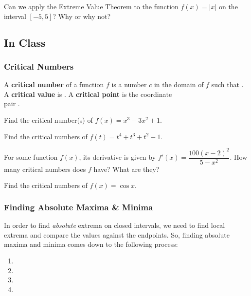 \documentclass[notes]{subfiles}
\begin{document}
		\begin{ex}
			Can we apply the Extreme Value Theorem to the function $f(x) = |x|$ on the interval $[-5,5]$?  Why or why not?
		\end{ex}
			\newpage
			
	\subsection*{In Class}
	\subsubsection*{Critical Numbers}
		\begin{defn}
			A \textbf{critical number} of a function \(f\) is a number \(c\) in the domain of \(f\) such that\vspace{20pt} .  A \textbf{critical value} is\vspace{20pt} .  A \textbf{critical point} is the coordinate\\ \vspace{5pt} pair  .
		\end{defn}
		
		\begin{ex}
			Find the critical number(s) of \(f(x) = x^3 -3x^2 + 1\).
		\end{ex}
			
		\begin{ex}
			Find the critical numbers of \(f(t) = t^4 + t^3+t^2 + 1\).
		\end{ex}
			\newpage
		\begin{ex}
			For some function \(f(x)\), its derivative is given by \(f'(x) = \dfrac{100(x-2)^2}{5-x^2}\).  How many critical numbers does \(f\) have?  What are they?
		\end{ex}	
			
		\begin{ex}
			Find the critical numbers of \(f(x) = \cos x\).
		\end{ex}
	
	\subsubsection*{Finding Absolute Maxima \& Minima}
		In order to find \emph{absolute} extrema on closed intervals, we need to find local extrema and compare the values against the endpoints.  So, finding absolute maxima and minima comes down to the following process:\\
			\begin{enumerate}
			\setlength\itemsep{25pt}
				\item 
				\item
				\item
				\item
			\end{enumerate}
			\newpage
		
\end{document}
